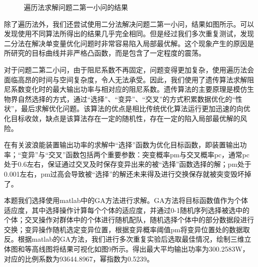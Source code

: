 \documentclass[12pt,utf8]{article}
\begin{document}
\begin{figure}[h]
{\begin{minipage}[t]{0.49\textwidth}
		\end{minipage}
	}
	\caption{遍历法求解问题二第一小问的结果}
\end{figure}


除了遍历法外，我们还尝试使用二分法解决问题二第一小问，结果如图所示。可以发现使用不同算法所得出的结果几乎完全相同。但是经过我们多次重复测试，发现二分法在解决单变量优化问题时非常容易陷入局部最优解。这个现象产生的原因是所研究的目标曲线并非严格凸函数，而是包含了一定程度的震荡。


对于问题二第二小问，由于阻尼系数不再固定，问题变得更加复杂，使用遍历法会面临高昂的时间与空间复杂度，令人无法承受。因此，我们使用了遗传算法求解阻尼系数变化时的最大输出功率与相对应的阻尼系数。遗传算法的主要原理是模仿生物界自然选择的方式，通过“选择”、“变异”、“交叉”的方式积累数据优化的“性状”，最后求解优化问题。该算法的优点是相比传统优化算法运行更加迅速的向优化目标收敛，缺点是该算法存在一定的随机性，存在一定的陷入局部最优解的风险。

在有关波浪能装置输出功率的求解中“选择”函数为优化目标函数，即装置输出功率；“变异”与“交叉”函数包括两个重要参数：突变概率pm与交叉概率pc，通常pc处于0.6左右，保证通过交叉及时保存变异出来的被“选择”函数选择的解；pm处于0.001左右，pm过高会导致被“选择”的解还未来得及进行交换保存就被突变毁坏掉了。

本题我们选择使用matlab中的GA方法进行求解。GA方法将目标函数值作为个体适应度，其中选择操作计算每个个体的适应度，并通过0-1随机序列选择被选中的个体；交叉操作对群体中的个体进行随机配队，随机选择个体中的部分数据段进行交换；变异操作随机选定变异位置，根据变异概率阈值pm将变异位置处的数据取反。根据matlab的GA方法，我们进行多次重复实验后选取最佳情况，绘制三维立体图和等高线图将结果可视化如图9所示。得出最大平均输出功率为300.2583W，对应的比例系数为93644.8967，幂指数为0.5239。
\end{document}

